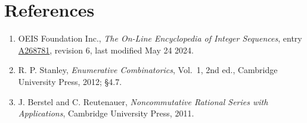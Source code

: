 \documentclass[11pt]{article}
\theoremstyle{definition}
\begin{document}
\section{References}

\begin{enumerate}

\item OEIS Foundation Inc., \emph{The On-Line Encyclopedia of Integer Sequences}, entry \href{https://oeis.org/A268781}{A268781}, revision 6, last modified May 24 2024.

\item R. P. Stanley, \emph{Enumerative Combinatorics}, Vol.~1, 2nd ed., Cambridge University Press, 2012; \S4.7.

\item J. Berstel and C. Reutenauer, \emph{Noncommutative Rational Series with Applications}, Cambridge University Press, 2011.

\end{enumerate}
\end{document}
